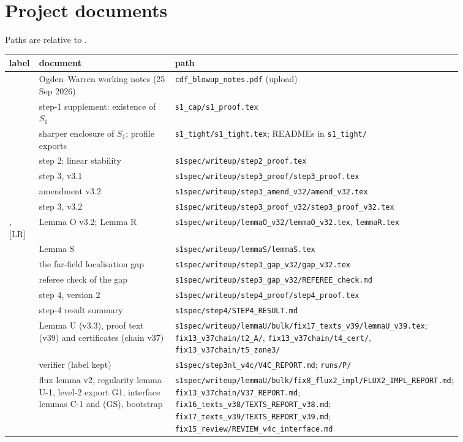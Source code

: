 \documentclass[11pt]{amsart}
\theoremstyle{definition}
\theoremstyle{remark}
\newcommand{\fn}[1]{\texttt{\detokenize{#1}}}
\newcommand{\dref}[1]{[\textsf{#1}]}
\newcommand{\pth}[1]{\nolinkurl{#1}}
\begin{document}
\appendix
\section{Project documents}\label{app:docs}
Paths are relative to \fn{/home/claude/}.
\begin{center}
\footnotesize
\begin{tabular}{@{}lp{0.30\linewidth}p{0.56\linewidth}@{}}\toprule
label & document & path\\\midrule
\dref{OW} & Ogden--Warren working notes (25 Sep 2026) & \pth{cdf_blowup_notes.pdf} (upload)\\
\dref{S1} & step-1 supplement: existence of $S_1$ & \pth{s1_cap/s1_proof.tex}\\
\dref{S1t} & sharper enclosure of $S_1$; profile exports & \pth{s1_tight/s1_tight.tex}; READMEs in \pth{s1_tight/}\\
\dref{S2} & step 2: linear stability & \pth{s1spec/writeup/step2_proof.tex}\\
\dref{S3} & step 3, v3.1 & \pth{s1spec/writeup/step3_proof/step3_proof.tex}\\
\dref{S3a} & amendment v3.2 & \pth{s1spec/writeup/step3_amend_v32/amend_v32.tex}\\
\dref{S3'} & step 3, v3.2 & \pth{s1spec/writeup/step3_proof_v32/step3_proof_v32.tex}\\
\dref{LO}, \dref{LR} & Lemma O v3.2; Lemma R & \pth{s1spec/writeup/lemmaO_v32/lemmaO_v32.tex}, \pth{lemmaR.tex}\\
\dref{LS} & Lemma S & \pth{s1spec/writeup/lemmaS/lemmaS.tex}\\
\dref{GAP} & the far-field localisation gap & \pth{s1spec/writeup/step3_gap_v32/gap_v32.tex}\\
\dref{REF} & referee check of the gap & \pth{s1spec/writeup/step3_gap_v32/REFEREE_check.md}\\
\dref{S4} & step 4, version 2 & \pth{s1spec/writeup/step4_proof/step4_proof.tex}\\
\dref{R4} & step-4 result summary & \pth{s1spec/step4/STEP4_RESULT.md}\\
\dref{LU} & Lemma U (v3.3), proof text (v39) and certificates (chain v37) & \pth{s1spec/writeup/lemmaU/bulk/fix17_texts_v39/lemmaU_v39.tex}; \pth{fix13_v37chain/t2_A/}, \pth{fix13_v37chain/t4_cert/}, \pth{fix13_v37chain/t5_zone3/}\\
\dref{V4B} & verifier \fn{fin13v4c} (label kept) & \pth{s1spec/step3nl_v4c/V4C_REPORT.md}; \pth{runs/P/}\\
\dref{FX2} & flux lemma v2, regularity lemma U-1, level-2 export G1, interface lemmas C-1 and (GS), bootstrap & \pth{s1spec/writeup/lemmaU/bulk/fix8_flux2_impl/FLUX2_IMPL_REPORT.md}; \pth{fix13_v37chain/V37_REPORT.md}; \pth{fix16_texts_v38/TEXTS_REPORT_v38.md}; \pth{fix17_texts_v39/TEXTS_REPORT_v39.md}; \pth{fix15_review/REVIEW_v4c_interface.md}\\

\end{tabular}
\end{center}
\end{document}
